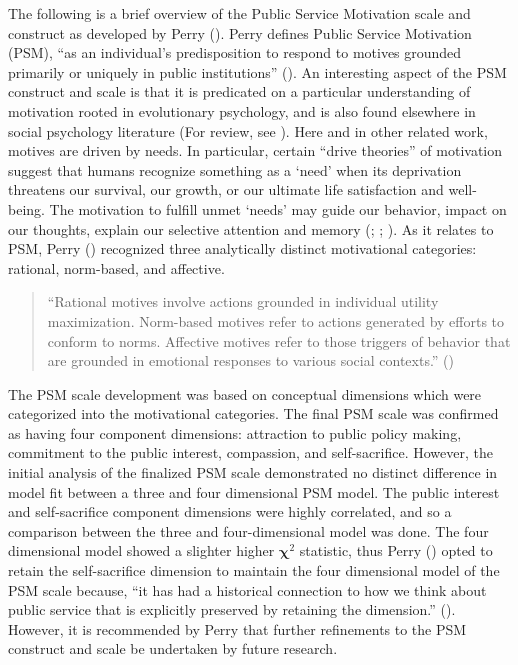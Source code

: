 \documentclass[
  11pt,
  a4paper,
]{article}
\begin{document}
The following is a brief overview of the Public Service Motivation scale
and construct as developed by Perry ().
Perry defines Public Service Motivation (PSM), ``as an individual's
predisposition to respond to motives grounded primarily or uniquely in
public institutions'' (). An
interesting aspect of the PSM construct and scale is that it is
predicated on a particular understanding of motivation rooted in
evolutionary psychology, and is also found elsewhere in social
psychology literature (For review, see
). Here and in
other related work, motives are driven by needs. In particular, certain
``drive theories'' of motivation suggest that humans recognize something
as a `need' when its deprivation threatens our survival, our growth, or
our ultimate life satisfaction and well-being. The motivation to fulfill
unmet `needs' may guide our behavior, impact on our thoughts, explain
our selective attention and memory (; ;
). As it relates to PSM, Perry
() recognized three analytically distinct
motivational categories: rational, norm-based, and affective.

\begin{quote}
``Rational motives involve actions grounded in individual utility
maximization. Norm-based motives refer to actions generated by efforts
to conform to norms. Affective motives refer to those triggers of
behavior that are grounded in emotional responses to various social
contexts.'' ()
\end{quote}

The PSM scale development was based on conceptual dimensions which were
categorized into the motivational categories. The final PSM scale was
confirmed as having four component dimensions: attraction to public
policy making, commitment to the public interest, compassion, and
self-sacrifice. However, the initial analysis of the finalized PSM scale
demonstrated no distinct difference in model fit between a three and
four dimensional PSM model. The public interest and self-sacrifice
component dimensions were highly correlated, and so a comparison between
the three and four-dimensional model was done. The four dimensional
model showed a slighter higher \(𝛘^2\) statistic, thus Perry
() opted to retain the self-sacrifice
dimension to maintain the four dimensional model of the PSM scale
because, ``it has had a historical connection to how we think about
public service that is explicitly preserved by retaining the
dimension.'' (). However, it is
recommended by Perry that further refinements to the PSM construct and
scale be undertaken by future research.
\end{document}
